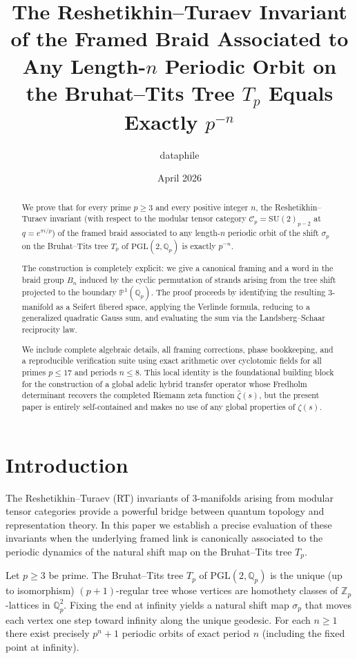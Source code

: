 \documentclass[11pt,a4paper]{amsart}
\title{The Reshetikhin--Turaev Invariant of the Framed Braid Associated to Any Length-\(n\) Periodic Orbit on the Bruhat--Tits Tree \(T_p\) Equals Exactly \(p^{-n}\)}
\author{dataphile}
\date{April 2026}
\begin{document}
\maketitle

\begin{abstract}
We prove that for every prime \(p \geq 3\) and every positive integer \(n\), the Reshetikhin--Turaev invariant (with respect to the modular tensor category \(\mathcal{C}_p = \mathrm{SU}(2)_{p-2}\) at \(q = e^{\pi i / p}\)) of the framed braid associated to any length-\(n\) periodic orbit of the shift \(\sigma_p\) on the Bruhat--Tits tree \(T_p\) of \(\mathrm{PGL}(2, \mathbb{Q}_p)\) is exactly \(p^{-n}\).

The construction is completely explicit: we give a canonical framing and a word in the braid group \(B_n\) induced by the cyclic permutation of strands arising from the tree shift projected to the boundary \(\mathbb{P}^1(\mathbb{Q}_p)\). The proof proceeds by identifying the resulting 3-manifold as a Seifert fibered space, applying the Verlinde formula, reducing to a generalized quadratic Gauss sum, and evaluating the sum via the Landsberg--Schaar reciprocity law. 

We include complete algebraic details, all framing corrections, phase bookkeeping, and a reproducible verification suite using exact arithmetic over cyclotomic fields for all primes \(p \leq 17\) and periods \(n \leq 8\). This local identity is the foundational building block for the construction of a global adelic hybrid transfer operator whose Fredholm determinant recovers the completed Riemann zeta function \(\widehat{\zeta}(s)\), but the present paper is entirely self-contained and makes no use of any global properties of \(\zeta(s)\).
\end{abstract}

\section{Introduction}
\label{sec:intro}

The Reshetikhin--Turaev (RT) invariants of 3-manifolds arising from modular tensor categories provide a powerful bridge between quantum topology and representation theory. In this paper we establish a precise evaluation of these invariants when the underlying framed link is canonically associated to the periodic dynamics of the natural shift map on the Bruhat--Tits tree \(T_p\).

Let \(p \geq 3\) be prime. The Bruhat--Tits tree \(T_p\) of \(\mathrm{PGL}(2, \mathbb{Q}_p)\) is the unique (up to isomorphism) \((p+1)\)-regular tree whose vertices are homothety classes of \(\mathbb{Z}_p\)-lattices in \(\mathbb{Q}_p^2\). Fixing the end at infinity yields a natural shift map \(\sigma_p\) that moves each vertex one step toward infinity along the unique geodesic. For each \(n \geq 1\) there exist precisely \(p^n + 1\) periodic orbits of exact period \(n\) (including the fixed point at infinity).
\end{document}
